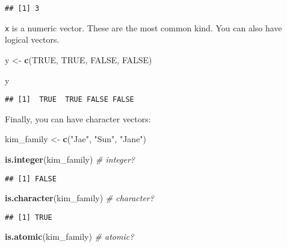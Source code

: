 \documentclass[
]{book}
\newenvironment{Shaded}{\begin{snugshade}}{\end{snugshade}}
\newcommand{\CommentTok}[1]{\textcolor[rgb]{0.56,0.35,0.01}{\textit{#1}}}
\newcommand{\KeywordTok}[1]{\textcolor[rgb]{0.13,0.29,0.53}{\textbf{#1}}}
\newcommand{\NormalTok}[1]{#1}
\newcommand{\OtherTok}[1]{\textcolor[rgb]{0.56,0.35,0.01}{#1}}
\newcommand{\StringTok}[1]{\textcolor[rgb]{0.31,0.60,0.02}{#1}}
\begin{document}
\begin{verbatim}
## [1] 3
\end{verbatim}

\texttt{x} is a numeric vector. These are the most common kind. You can also have logical vectors.

\begin{Shaded}
\begin{Highlighting}[]
\NormalTok{y \textless{}{-}}\StringTok{ }\KeywordTok{c}\NormalTok{(}\OtherTok{TRUE}\NormalTok{, }\OtherTok{TRUE}\NormalTok{, }\OtherTok{FALSE}\NormalTok{, }\OtherTok{FALSE}\NormalTok{)}

\NormalTok{y}
\end{Highlighting}
\end{Shaded}

\begin{verbatim}
## [1]  TRUE  TRUE FALSE FALSE
\end{verbatim}

Finally, you can have character vectors:

\begin{Shaded}
\begin{Highlighting}[]
\NormalTok{kim\_family \textless{}{-}}\StringTok{ }\KeywordTok{c}\NormalTok{(}\StringTok{"Jae"}\NormalTok{, }\StringTok{"Sun"}\NormalTok{, }\StringTok{"Jane"}\NormalTok{)}

\KeywordTok{is.integer}\NormalTok{(kim\_family) }\CommentTok{\# integer?}
\end{Highlighting}
\end{Shaded}

\begin{verbatim}
## [1] FALSE
\end{verbatim}

\begin{Shaded}
\begin{Highlighting}[]
\KeywordTok{is.character}\NormalTok{(kim\_family) }\CommentTok{\# character?}
\end{Highlighting}
\end{Shaded}

\begin{verbatim}
## [1] TRUE
\end{verbatim}

\begin{Shaded}
\begin{Highlighting}[]
\KeywordTok{is.atomic}\NormalTok{(kim\_family) }\CommentTok{\# atomic?}
\end{Highlighting}
\end{Shaded}
\end{document}
